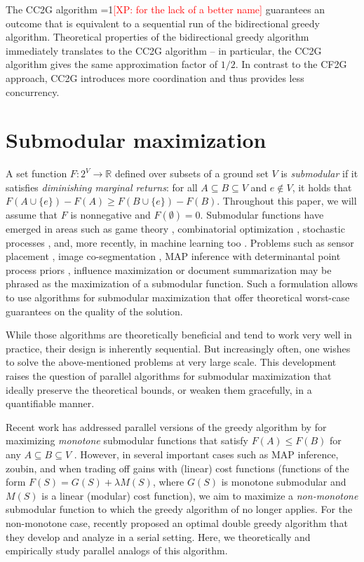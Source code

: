 \documentclass{article} %
\newcommand{\hogwild}{CF2G}
\newcommand{\occ}{CC2G}
\newcommand{\Comments}{1}
\newcommand{\note}[2]{\ifnum\Comments=1\textcolor{#1}{#2}\fi}
\newcommand{\xinghao}[1]{\note{red}{[XP: #1]}}
\newcommand{\union}{\cup}
\begin{document}
The \occ{} algorithm \xinghao{for the lack of a better name} guarantees an outcome that is equivalent to a sequential run of the bidirectional greedy algorithm.
Theoretical properties of the bidirectional greedy algorithm immediately translates to the \occ{} algorithm -- in particular, the \occ{} algorithm gives the same approximation factor of $1/2$.
In contrast to the \hogwild{} approach, \occ{} introduces more coordination and thus provides less concurrency.











\section{Submodular maximization}
A set function $F: 2^V \to \mathbb{R}$ defined over subsets of a ground set $V$ is \emph{submodular} if it satisfies \emph{diminishing marginal returns}: for all $A \subseteq B \subseteq V$ and  $e \notin V$, it holds that $F(A \union \{e\}) - F(A) \geq F(B \union \{e\}) - F(B)$. Throughout this paper, we will assume that $F$ is nonnegative and $F(\emptyset)=0$. Submodular functions have emerged in areas such as game theory \cite{}, combinatorial optimization \cite{}, stochastic processes \cite{}, and, more recently, in machine learning too \cite{tutorial,tutorial2}. Problems such as sensor placement \cite{krauseGuestrin11}, image co-segmentation \cite{kim11}, MAP inference with determinantal point process priors \cite{}, influence maximization \cite{} or document summarization \cite{} may be phrased as the maximization of a submodular function. Such a formulation allows to use algorithms for submodular maximization \cite{} that offer theoretical worst-case guarantees on the quality of the solution.

While those algorithms are theoretically beneficial and tend to work very well in practice, their design is inherently sequential. But increasingly often, one wishes to solve the above-mentioned problems at very large scale. This development raises the question of parallel algorithms for submodular maximization that ideally preserve the theoretical bounds, or weaken them gracefully, in a quantifiable manner. 

Recent work has addressed parallel versions of the greedy algorithm by \cite{} for maximizing \emph{monotone} submodular functions that satisfy $F(A) \leq F(B)$ for any $A \subseteq B \subseteq V$ \cite{krause, mapgreedy}. However, in several important cases such as MAP inference, zoubin, and when trading off gains with (linear) cost functions (functions of the form $F(S) = G(S) + \lambda M(S)$, where $G(S)$ is monotone submodular and $M(S)$ is a linear (modular) cost function), we aim to maximize a \emph{non-monotone} submodular function to which the greedy algorithm of \cite{} no longer applies. For the non-monotone case, \citet{buchbinder2012} recently proposed an optimal double greedy algorithm that they develop and analyze in a serial setting. Here, we theoretically and empirically study parallel analogs of this algorithm.
\end{document}
